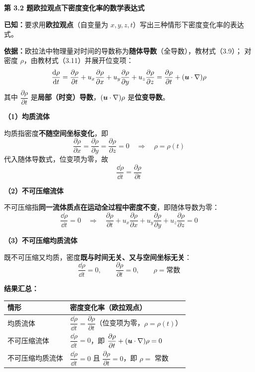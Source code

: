 \noindent\textbf{第 3.2 题\quad 欧拉观点下密度变化率的数学表达式}

\begin{jie}
\textbf{已知：}要求用\textbf{欧拉观点}（自变量为 $x,y,z,t$）写出三种情形下密度变化率的表达式。

\textbf{依据：}欧拉法中物理量对时间的导数称为\textbf{随体导数}（全导数），教材式（3.9）；
对密度 $\rho$，由教材式（3.11）并展开位变项：
\[ \frac{\mathrm{d}\rho}{\mathrm{d} t}=\frac{\partial\rho}{\partial t}+u_x\frac{\partial\rho}{\partial x}
   +u_y\frac{\partial\rho}{\partial y}+u_z\frac{\partial\rho}{\partial z}
   =\frac{\partial\rho}{\partial t}+(\bm{u}\cdot\nabla)\rho \]
其中 $\dfrac{\partial\rho}{\partial t}$ 是\textbf{局部（时变）导数}，$(\bm{u}\cdot\nabla)\rho$ 是\textbf{位变导数}。

\textbf{（1）均质流体}

均质指密度\textbf{不随空间坐标变化}，即
\[ \frac{\partial\rho}{\partial x}=\frac{\partial\rho}{\partial y}=\frac{\partial\rho}{\partial z}=0
   \quad\Longrightarrow\quad \rho=\rho(t) \]
代入随体导数式，位变项为零，故
\[ \frac{\dd\rho}{\dd t}=\frac{\partial\rho}{\partial t} \]

\textbf{（2）不可压缩流体}

不可压缩指\textbf{同一流体质点在运动全过程中密度不变}，即随体导数为零：
\[ \frac{\dd\rho}{\dd t}=0
   \quad\Longrightarrow\quad
   \frac{\partial\rho}{\partial t}+u_x\frac{\partial\rho}{\partial x}+u_y\frac{\partial\rho}{\partial y}
   +u_z\frac{\partial\rho}{\partial z}=0 \]

\textbf{（3）不可压缩均质流体}

既不可压缩又均质，密度\textbf{既与时间无关、又与空间坐标无关}：
\[ \frac{\dd\rho}{\dd t}=0,\qquad \frac{\partial\rho}{\partial t}=0,\qquad \rho=\text{常数} \]

\textbf{结果汇总：}
\begin{center}
\begin{tabularx}{\textwidth}{@{}lX@{}}
\toprule
情形 & 密度变化率（欧拉观点） \\
\midrule
均质流体 & $\dfrac{\dd\rho}{\dd t}=\dfrac{\partial\rho}{\partial t}$（位变项为零，$\rho=\rho(t)$） \\
不可压缩流体 & $\dfrac{\dd\rho}{\dd t}=0$，即 $\dfrac{\partial\rho}{\partial t}+(\bm{u}\cdot\nabla)\rho=0$ \\
不可压缩均质流体 & $\dfrac{\dd\rho}{\dd t}=0$ 且 $\dfrac{\partial\rho}{\partial t}=0$，即 $\rho=$ 常数 \\
\bottomrule
\end{tabularx}
\end{center}
\end{jie}

